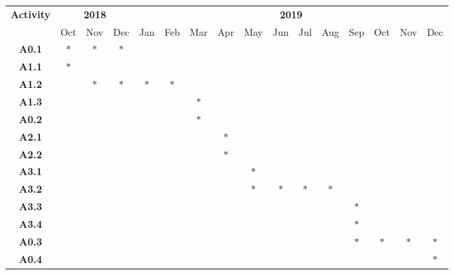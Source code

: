 \documentclass[English]{style/ic-tese-v3}
\begin{document}
\begin{table}[H]
\centering
\scriptsize
\begin{tabular}{|c|c|c|c|c|c|c|c|c|c|c|c|c|c|c|c|}
	\hline
    \multirow{2}{*}{\textbf{Activity}}
        & \multicolumn{3}{|c|}{\textbf{2018}} & \multicolumn{12}{|c|}{\textbf{2019}}\\
    \cline{2-16}
                  & Oct & Nov & Dec & Jan & Feb & Mar & Apr & May & Jun & Jul & Aug & Sep & Oct & Nov & Dec\\
    \hline
    \textbf{A0.1} & $*$ & $*$ & $*$ &     &     &     &     &     &     &     &     &     &     &     &     \\
    \hline
    \textbf{A1.1} & $*$ &     &     &     &     &     &     &     &     &     &     &     &     &     &     \\
    \hline
    \textbf{A1.2} &     & $*$ & $*$ & $*$ & $*$ &     &     &     &     &     &     &     &     &     &     \\
    \hline
    \textbf{A1.3} &     &     &     &     &     & $*$ &     &     &     &     &     &     &     &     &     \\
    \hline
    \textbf{A0.2} &     &     &     &     &     & $*$ &     &     &     &     &     &     &     &     &     \\
    \hline
    \textbf{A2.1} &     &     &     &     &     &     & $*$ &     &     &     &     &     &     &     &     \\
    \hline
    \textbf{A2.2} &     &     &     &     &     &     & $*$ &     &     &     &     &     &     &     &     \\
    \hline
    \textbf{A3.1} &     &     &     &     &     &     &     & $*$ &     &     &     &     &     &     &     \\
    \hline
    \textbf{A3.2} &     &     &     &     &     &     &     & $*$ & $*$ & $*$ & $*$ &     &     &     &     \\
    \hline
    \textbf{A3.3} &     &     &     &     &     &     &     &     &     &     &     & $*$ &     &     &     \\
    \hline
    \textbf{A3.4} &     &     &     &     &     &     &     &     &     &     &     & $*$ &     &     &     \\
    \hline
    \textbf{A0.3} &     &     &     &     &     &     &     &     &     &     &     & $*$ & $*$ & $*$ & $*$ \\
    \hline
    \textbf{A0.4} &     &     &     &     &     &     &     &     &     &     &     &     &     &     & $*$ \\
    \hline
\end{tabular}
\end{table}
\end{document}
